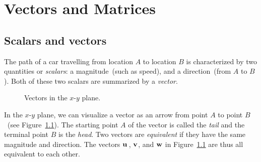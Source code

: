 
\chapter{Vectors and Matrices}



\section{Scalars and vectors}
\label{sec:scalars_vectors}

The path of a car travelling from location $A$ to location $B$ is
characterized by two quantities or \emph{scalars}: a
magnitude~(such as speed), and a direction~(from $A$
to $B$). Both of these two scalars are summarized by a
\emph{vector}.

\begin{figure}[!htpb]
\centering
{}
\caption{Vectors in the $x$-$y$ plane.}
\label{fig:vectors_matrices:plane_vectors}
\end{figure}

In the $x$-$y$ plane, we can visualize a vector as an arrow from point
$A$ to point $B$~(see
Figure~\ref{fig:vectors_matrices:plane_vectors}). The starting point
$A$ of the vector is called the
\emph{tail} and the terminal point $B$
is the \emph{head}. Two vectors are
\emph{equivalent} if they have the same
magnitude and direction. The vectors $\operatorname*{\mathbf{u}}{}$, $\operatorname*{\mathbf{v}}$, and $\operatorname*{\mathbf{w}}$ in
Figure~\ref{fig:vectors_matrices:plane_vectors} are thus all
equivalent to each other.

